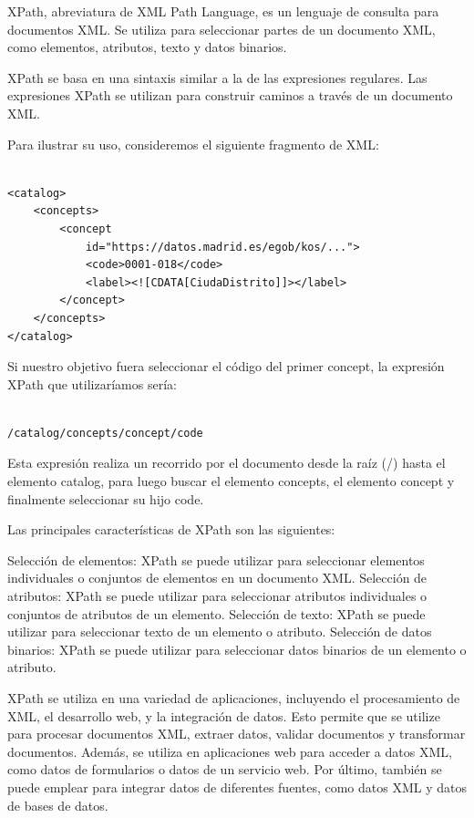 XPath, abreviatura de XML Path Language, es un lenguaje de consulta para documentos XML. Se utiliza para seleccionar partes de un documento XML, como elementos, atributos, texto y datos binarios.

XPath se basa en una sintaxis similar a la de las expresiones regulares. Las expresiones XPath se utilizan para construir caminos a través de un documento XML.

Para ilustrar su uso, consideremos el siguiente fragmento de XML:

\lstset{inputencoding=utf8/latin1}
\begin{lstlisting}
    
<catalog>
    <concepts>
        <concept
            id="https://datos.madrid.es/egob/kos/...">
            <code>0001-018</code>
            <label><![CDATA[CiudaDistrito]]></label>
        </concept>
    </concepts>
</catalog>

\end{lstlisting}

Si nuestro objetivo fuera seleccionar el código del primer concept, la expresión XPath que utilizaríamos sería:

\lstset{inputencoding=utf8/latin1}
\begin{lstlisting}

/catalog/concepts/concept/code

\end{lstlisting}

Esta expresión realiza un recorrido por el documento desde la raíz (/) hasta el elemento catalog, para luego buscar el elemento concepts, el elemento concept y finalmente seleccionar su hijo code.

Las principales características de XPath son las siguientes:

Selección de elementos: XPath se puede utilizar para seleccionar elementos individuales o conjuntos de elementos en un documento XML.
Selección de atributos: XPath se puede utilizar para seleccionar atributos individuales o conjuntos de atributos de un elemento.
Selección de texto: XPath se puede utilizar para seleccionar texto de un elemento o atributo.
Selección de datos binarios: XPath se puede utilizar para seleccionar datos binarios de un elemento o atributo.

XPath se utiliza en una variedad de aplicaciones, incluyendo el procesamiento de XML, el desarrollo web, y la integración de datos. Esto permite que se utilize para procesar documentos XML, extraer datos, validar documentos y transformar documentos. Además, se utiliza en aplicaciones web para acceder a datos XML, como datos de formularios o datos de un servicio web. Por último, también se puede emplear para integrar datos de diferentes fuentes, como datos XML y datos de bases de datos.

